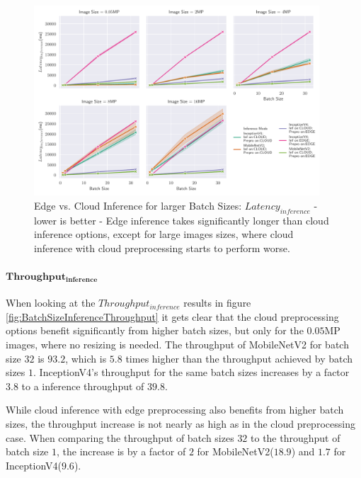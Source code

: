 \begin{figure}[!htb]
\centering
\includegraphics[width=0.95\textwidth]{./Bilder/single_plots/batch_size_plots/Effects_of_Batch_size_Inference_Latencies.pdf}
\caption[Edge vs. Cloud Inference for larger Batch Sizes:  $Latency_{inference}$ - lower is better]{Edge vs. Cloud Inference for larger Batch Sizes:  $Latency_{inference}$ - lower is better - Edge inference takes significantly longer than cloud inference options, except for large images sizes, where cloud inference with cloud preprocessing starts to perform worse.}
\label{fig:BatchSizeInferenceLatency}
\end{figure}


\paragraph{$\mathbf{Throughput_{inference}}$}
When looking at the $Throughput_{inference}$ results in figure \ref{fig:BatchSizeInferenceThroughput} it gets clear that the cloud preprocessing options benefit significantly from higher batch sizes, but only for the $0.05$MP images, where no resizing is needed.
The throughput of MobileNetV2 for batch size $32$ is $93.2$, which is $5.8$ times higher than the throughput achieved by batch sizes $1$. 
InceptionV4's throughput for the same batch sizes increases by a factor $3.8$ to a inference throughput of $39.8$.

While cloud inference with edge preprocessing also benefits from higher batch sizes, the throughput increase is not nearly as high as in the cloud preprocessing case.
When comparing the throughput of batch sizes $32$ to the throughput of batch size $1$, the increase is by a factor of $2$ for MobileNetV2($18.9$) and $1.7$ for InceptionV4($9.6$).

